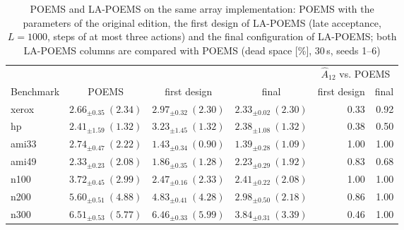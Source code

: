 \begin{table}
\centering
\footnotesize
\setlength{\tabcolsep}{4pt}
\begin{tabular}{@{}lcccrr@{}}
\toprule
 &  &  &  & \multicolumn{2}{c}{$\hat{A}_{12}$ vs. POEMS} \\
Benchmark & POEMS & first design & final & first design & final \\
\midrule
xerox & $2.66_{\pm 0.35}\ (2.34)$ & $2.97_{\pm 0.32}\ (2.30)$ & $\mathbf{2.33_{\pm 0.02}\ (2.30)}$ & 0.33 & 0.92 \\
hp & $2.41_{\pm 1.59}\ (1.32)$ & $3.23_{\pm 1.45}\ (1.32)$ & $2.38_{\pm 1.08}\ (1.32)$ & 0.38 & 0.50 \\
ami33 & $2.74_{\pm 0.47}\ (2.22)$ & $\mathbf{1.43_{\pm 0.34}\ (0.90)}$ & $\mathbf{1.39_{\pm 0.28}\ (1.09)}$ & 1.00 & 1.00 \\
ami49 & $2.33_{\pm 0.23}\ (2.08)$ & $1.86_{\pm 0.35}\ (1.28)$ & $2.23_{\pm 0.29}\ (1.92)$ & 0.83 & 0.68 \\
n100 & $3.72_{\pm 0.45}\ (2.99)$ & $\mathbf{2.47_{\pm 0.16}\ (2.33)}$ & $\mathbf{2.41_{\pm 0.22}\ (2.08)}$ & 1.00 & 1.00 \\
n200 & $5.60_{\pm 0.51}\ (4.88)$ & $\mathbf{4.83_{\pm 0.41}\ (4.28)}$ & $\mathbf{2.98_{\pm 0.50}\ (2.18)}$ & 0.86 & 1.00 \\
n300 & $6.51_{\pm 0.53}\ (5.77)$ & $6.46_{\pm 0.33}\ (5.99)$ & $\mathbf{3.84_{\pm 0.31}\ (3.39)}$ & 0.46 & 1.00 \\
\bottomrule
\end{tabular}
\caption{POEMS and LA-POEMS on the same array implementation: POEMS with the parameters of the original edition, the first design of LA-POEMS (late acceptance, $L = 1000$, steps of at most three actions) and the final configuration of LA-POEMS; both LA-POEMS columns are compared with POEMS (dead space [\%], 30\,s, seeds 1--6)}
\label{tab:rq3equal}
\end{table}
